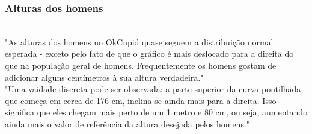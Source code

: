 \begin{frame}
\frametitle{Alturas dos homens}

{
\pause
\justifying
{\footnotesize \\ "As alturas dos homens no OkCupid quase seguem a distribuição normal esperada - exceto pelo fato de que o gráfico é mais deslocado para a direita do que na população geral de homens. Frequentemente os homens gostam de adicionar alguns centímetros à sua altura verdadeira." \\
\justifying
"Uma vaidade discreta pode ser observada: a parte superior da curva pontilhada, que começa em cerca de 176 cm, inclina-se ainda mais para a direita. Isso significa que eles chegam mais perto de um 1 metro e 80 cm, ou seja, aumentando ainda mais o valor de referência da altura desejada pelos homens."
}
}


\end{frame}


